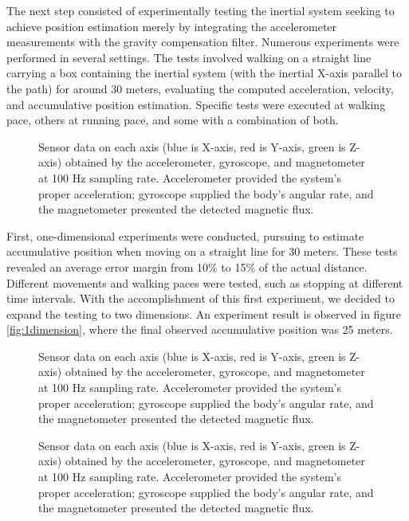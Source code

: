 The next step consisted of experimentally testing the inertial system seeking to achieve position estimation merely by integrating the accelerometer measurements with the gravity compensation filter. Numerous experiments were performed in several settings. The tests involved walking on a straight line carrying a box containing the inertial system (with the inertial X-axis parallel to the path) for around 30 meters, evaluating the computed acceleration, velocity, and accumulative position estimation. Specific tests were executed at walking pace, others at running pace, and some with a combination of both.

\begin{figure}[!h]
    \centering
    \resizebox{1\linewidth}{!}{}
    \caption{Sensor data on each axis (blue is X-axis, red is Y-axis, green is Z-axis) obtained by the accelerometer, gyroscope, and magnetometer at 100 Hz sampling rate. Accelerometer provided the system's proper acceleration; gyroscope supplied the body's angular rate, and the magnetometer presented the detected magnetic flux.}
    \label{fig:sensoroutput}
\end{figure}

First, one-dimensional experiments were conducted, pursuing to estimate accumulative position when moving on a straight line for 30 meters. These tests revealed an average error margin from 10\% to 15\% of the actual distance. Different movements and walking paces were tested, such as stopping at different time intervals. With the accomplishment of this first experiment, we decided to expand the testing to two dimensions. An experiment result is observed in figure \ref{fig:1dimension}, where the final observed accumulative position was 25 meters.

\begin{figure}
    \centering
    \resizebox{1\linewidth}{!}{}
    \caption{Sensor data on each axis (blue is X-axis, red is Y-axis, green is Z-axis) obtained by the accelerometer, gyroscope, and magnetometer at 100 Hz sampling rate. Accelerometer provided the system's proper acceleration; gyroscope supplied the body's angular rate, and the magnetometer presented the detected magnetic flux.}
    \label{fig:square}
\end{figure}

\begin{figure}
    \centering
    \resizebox{1\linewidth}{!}{}
    \caption{Sensor data on each axis (blue is X-axis, red is Y-axis, green is Z-axis) obtained by the accelerometer, gyroscope, and magnetometer at 100 Hz sampling rate. Accelerometer provided the system's proper acceleration; gyroscope supplied the body's angular rate, and the magnetometer presented the detected magnetic flux.}
    \label{fig:triangle}
\end{figure}

